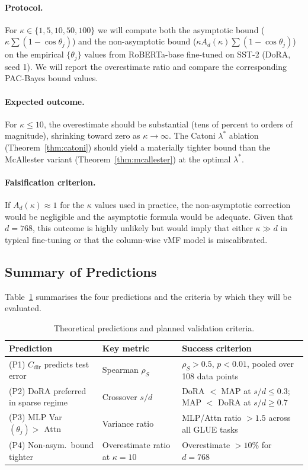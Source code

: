 \documentclass[11pt]{article}
\newcommand{\Ad}{A_d}
\begin{document}
\paragraph{Protocol.}
For $\kappa \in \{1, 5, 10, 50, 100\}$ we will compute both the
asymptotic bound ($\kappa\sum(1-\cos\theta_j)$) and the non-asymptotic
bound ($\kappa\Ad(\kappa)\sum(1-\cos\theta_j)$) on the empirical
$\{\theta_j\}$ values from RoBERTa-base fine-tuned on SST-2
(DoRA, seed 1).
We will report the overestimate ratio and compare the corresponding
PAC-Bayes bound values.

\paragraph{Expected outcome.}
For $\kappa \leq 10$, the overestimate should be substantial (tens of
percent to orders of magnitude), shrinking toward zero as $\kappa \to \infty$.
The Catoni $\lambda^*$ ablation (Theorem~\ref{thm:catoni}) should yield
a materially tighter bound than the McAllester variant
(Theorem~\ref{thm:mcallester}) at the optimal $\lambda^*$.

\paragraph{Falsification criterion.}
If $\Ad(\kappa) \approx 1$ for the $\kappa$ values used in practice,
the non-asymptotic correction would be negligible and the asymptotic
formula would be adequate.
Given that $d = 768$, this outcome is highly unlikely but would imply
that either $\kappa \gg d$ in typical fine-tuning or that the
column-wise vMF model is miscalibrated.

\subsection{Summary of Predictions}

Table~\ref{tab:exp_summary} summarises the four predictions and the
criteria by which they will be evaluated.

\begin{table}[ht]
\centering
\caption{Theoretical predictions and planned validation criteria.}
\label{tab:exp_summary}
\begin{tabular}{p{3.5cm}p{3cm}p{4.5cm}}
\toprule
Prediction & Key metric & Success criterion \\
\midrule
(P1) $C_{\mathrm{dir}}$ predicts test error &
  Spearman $\rho_S$ &
  $\rho_S > 0.5$, $p < 0.01$, pooled over 108 data points \\
(P2) DoRA preferred in sparse regime &
  Crossover $s/d$ &
  DoRA $<$ MAP at $s/d \leq 0.3$; MAP $<$ DoRA at $s/d \geq 0.7$ \\
(P3) MLP Var$(\theta_j) >$ Attn &
  Variance ratio &
  MLP/Attn ratio $> 1.5$ across all GLUE tasks \\
(P4) Non-asym.\ bound tighter &
  Overestimate ratio at $\kappa=10$ &
  Overestimate $> 10\%$ for $d=768$ \\
\bottomrule
\end{tabular}
\end{table}
\end{document}
